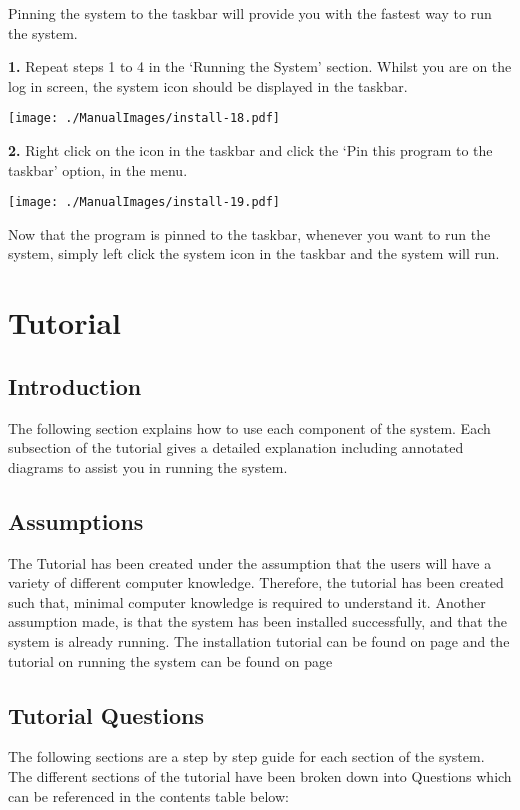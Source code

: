 Pinning the system to the taskbar will provide you with the fastest way to run the system.

\textbf{1.} Repeat steps 1 to 4 in the `Running the System' section. Whilst you are on the log in screen, the system icon should be displayed in the taskbar.

\texttt{[image: ./ManualImages/install-18.pdf]}

\textbf{2.} Right click on the icon in the taskbar and click the `Pin this program to the taskbar' option, in the menu.

\texttt{[image: ./ManualImages/install-19.pdf]}

Now that the program is pinned to the taskbar, whenever you want to run the system, simply left click the system icon in the taskbar and the system will run.

\pagebreak

\section{Tutorial}

\subsection{Introduction}
The following section explains how to use each component of the system. Each subsection of the tutorial gives a detailed explanation including annotated diagrams to assist you in running the system.


\subsection{Assumptions}

The Tutorial has been created under the assumption that the users will have a variety of different computer knowledge. Therefore, the tutorial has been created such that, minimal computer knowledge is required to understand it. Another assumption made, is that the system has been installed successfully, and that the system is already running. The installation tutorial can be found on page \pageref{fig:System Installation} and the tutorial on running the system can be found on page \pageref{fig:Running the System}

\subsection{Tutorial Questions}
The following sections are a step by step guide for each section of the system. The different sections of the tutorial have been broken down into Questions which can be referenced in the contents table below:

